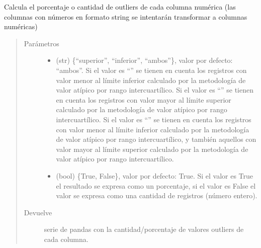 \documentclass[letterpaper,10pt,openany,spanish]{sphinxmanual}
\begin{document}
\begin{fulllineitems}
\begin{fulllineitems}
\label{\detokenize{calidad_datos:calidad_datos.CalidadDatos.ValoresExtremos}}
Calcula el porcentaje o cantidad de outliers de cada columna numérica             (las columnas con números en formato string se intentarán transformar             a columnas numéricas)
\begin{quote}\begin{description}
\item[{Parámetros}] \leavevmode\begin{itemize}
\item {} 
 \textendash{} (str) \{“superior”, “inferior”, “ambos”\}, valor por             defecto: “ambos”. Si el valor es “” se tienen en cuenta los             registros con valor menor al límite inferior calculado por la             metodología de valor atípico por rango intercuartílico. Si el valor es             “” se tienen en cuenta los registros con valor mayor al            límite superior calculado por la metodología de valor atípico por rango             intercuartílico. Si el valor es “” se tienen en cuenta los 
registros con valor menor al límite inferior calculado por la              metodología de valor atípico por rango intercuartílico, y también             aquellos con valor mayor al límite superior calculado por la             metodología de valor atípico por rango intercuartílico.

\item {} 
 \textendash{} (bool) \{True, False\}, valor por defecto: True. Si el valor es             True el resultado se expresa como un porcentaje, si el valor es False el 
valor se expresa como una cantidad de registros (número entero).

\end{itemize}

\item[{Devuelve}] \leavevmode
serie de pandas con la cantidad/porcentaje de valores outliers             de cada columna.

\end{description}\end{quote}


\end{fulllineitems}
\end{fulllineitems}
\end{document}
